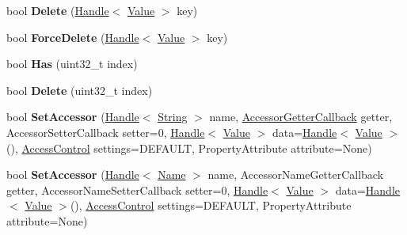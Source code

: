 \begin{DoxyCompactItemize}
\item 
\hypertarget{classv8_1_1Object_a6850815e31ba9fc75d368c69892cfd8b}{}bool {\bfseries Delete} (\hyperlink{classv8_1_1Handle}{Handle}$<$ \hyperlink{classv8_1_1Value}{Value} $>$ key)\label{classv8_1_1Object_a6850815e31ba9fc75d368c69892cfd8b}

\item 
\hypertarget{classv8_1_1Object_a8e7f3b8b70eb17bcb5cc087d5b6746d6}{}bool {\bfseries Force\+Delete} (\hyperlink{classv8_1_1Handle}{Handle}$<$ \hyperlink{classv8_1_1Value}{Value} $>$ key)\label{classv8_1_1Object_a8e7f3b8b70eb17bcb5cc087d5b6746d6}

\item 
\hypertarget{classv8_1_1Object_ac547af2f2d256d96991ff20159a44bfd}{}bool {\bfseries Has} (uint32\+\_\+t index)\label{classv8_1_1Object_ac547af2f2d256d96991ff20159a44bfd}

\item 
\hypertarget{classv8_1_1Object_a63f88a22cb5d994eedc1efc79520bc42}{}bool {\bfseries Delete} (uint32\+\_\+t index)\label{classv8_1_1Object_a63f88a22cb5d994eedc1efc79520bc42}

\item 
\hypertarget{classv8_1_1Object_a7590761426aae338f6ab308ff65d491c}{}bool {\bfseries Set\+Accessor} (\hyperlink{classv8_1_1Handle}{Handle}$<$ \hyperlink{classv8_1_1String}{String} $>$ name, \hyperlink{namespacev8_a722613c87061708a4f1aa050d095f868}{Accessor\+Getter\+Callback} getter, Accessor\+Setter\+Callback setter=0, \hyperlink{classv8_1_1Handle}{Handle}$<$ \hyperlink{classv8_1_1Value}{Value} $>$ data=\hyperlink{classv8_1_1Handle}{Handle}$<$ \hyperlink{classv8_1_1Value}{Value} $>$(), \hyperlink{namespacev8_a31d8355cb043d7d2dda3f4a52760b64e}{Access\+Control} settings=D\+E\+F\+A\+U\+L\+T, Property\+Attribute attribute=None)\label{classv8_1_1Object_a7590761426aae338f6ab308ff65d491c}

\item 
\hypertarget{classv8_1_1Object_ab9f33205026211b6722e30ac6c49c1ea}{}bool {\bfseries Set\+Accessor} (\hyperlink{classv8_1_1Handle}{Handle}$<$ \hyperlink{classv8_1_1Name}{Name} $>$ name, Accessor\+Name\+Getter\+Callback getter, Accessor\+Name\+Setter\+Callback setter=0, \hyperlink{classv8_1_1Handle}{Handle}$<$ \hyperlink{classv8_1_1Value}{Value} $>$ data=\hyperlink{classv8_1_1Handle}{Handle}$<$ \hyperlink{classv8_1_1Value}{Value} $>$(), \hyperlink{namespacev8_a31d8355cb043d7d2dda3f4a52760b64e}{Access\+Control} settings=D\+E\+F\+A\+U\+L\+T, Property\+Attribute attribute=None)\label{classv8_1_1Object_ab9f33205026211b6722e30ac6c49c1ea}


\end{DoxyCompactItemize}
